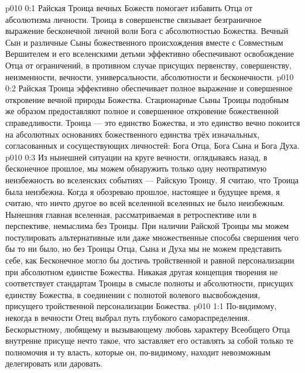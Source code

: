 \author{Всеобщий Цензор}
\vs p010 0:1 Райская Троица вечных Божеств помогает избавить Отца от абсолютизма личности. Троица в совершенстве связывает безграничное выражение бесконечной личной воли Бога с абсолютностью Божества. Вечный Сын и различные Сыны божественного происхождения вместе с Совместным Вершителем и его вселенскими детьми эффективно обеспечивают освобождение Отца от ограничений, в противном случае присущих первенству, совершенству, неизменности, вечности, универсальности, абсолютности и бесконечности.
\vs p010 0:2 Райская Троица эффективно обеспечивает полное выражение и совершенное откровение вечной природы Божества. Стационарные Сыны Троицы подобным же образом предоставляют полное и совершенное откровение божественной справедливости. Троица --- это единство Божества, и это единство вечно покоится на абсолютных основаниях божественного единства трёх изначальных, согласованных и сосуществующих личностей: Бога Отца, Бога Сына и Бога Духа.
\vs p010 0:3 \pc Из нынешней ситуации на круге вечности, оглядываясь назад, в бесконечное прошлое, мы можем обнаружить только одну неотвратимую неизбежность во вселенских событиях --- Райскую Троицу. Я считаю, что Троица была неизбежна. Когда я обозреваю прошлое, настоящее и будущее время, я считаю, что ничто другое во всей вселенной вселенных не было неизбежным. Нынешняя главная вселенная, рассматриваемая в ретроспективе или в перспективе, немыслима без Троицы. При наличии Райской Троицы мы можем постулировать альтернативные или даже множественные способы свершения чего бы то ни было, но без Троицы Отца, Сына и Духа мы не можем представить себе, как Бесконечное могло бы достичь тройственной и равной персонализации при абсолютном единстве Божества. Никакая другая концепция творения не соответствует стандартам Троицы в смысле полноты и абсолютности, присущих единству Божества, в соединении с полнотой волевого высвобождения, присущего тройственной персонализации Божества.
\vs p010 1:1 По\hyp{}видимому, некогда в вечности Отец выбрал путь глубокого самораспределения. Бескорыстному, любящему и вызывающему любовь характеру Всеобщего Отца внутренне присуще нечто такое, что заставляет его оставлять за собой только те полномочия и ту власть, которые он, по\hyp{}видимому, находит невозможным делегировать или даровать.
